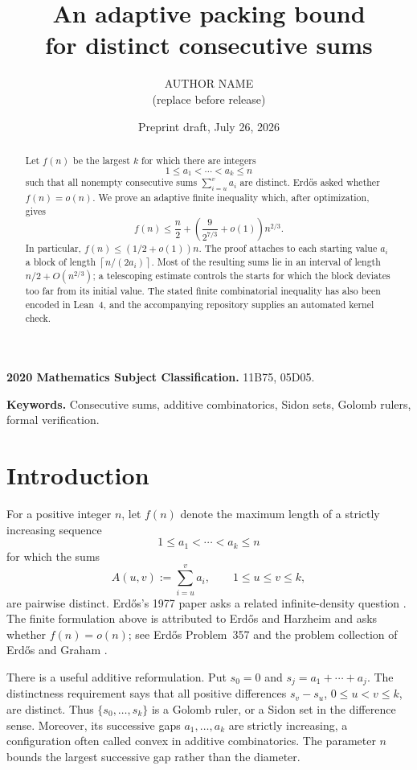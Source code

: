 \documentclass[11pt]{article}
\title{\bfseries An adaptive packing bound\\
for distinct consecutive sums}
\author{AUTHOR NAME\\\small (replace before release)}
\date{Preprint draft, July 26, 2026}
\numberwithin{equation}{section}
\theoremstyle{remark}
\newcommand{\ceil}[1]{\left\lceil #1\right\rceil}
\begin{document}
\maketitle

\begin{abstract}
Let \(f(n)\) be the largest \(k\) for which there are integers
\[
  1\leq a_1<\cdots<a_k\leq n
\]
such that all nonempty consecutive sums
\(\sum_{i=u}^{v}a_i\) are distinct.  Erd\H{o}s asked whether
\(f(n)=o(n)\).  We prove an adaptive finite inequality which, after
optimization, gives
\[
  f(n)\leq \frac n2+
  \left(\frac{9}{2^{7/3}}+o(1)\right)n^{2/3}.
\]
In particular, \(f(n)\leq (1/2+o(1))n\).  The proof attaches to each
starting value \(a_i\) a block of length
\(\ceil{n/(2a_i)}\).  Most of the resulting sums lie in an interval of
length \(n/2+O(n^{2/3})\); a telescoping estimate controls the starts
for which the block deviates too far from its initial value.  The
stated finite combinatorial inequality has also been encoded in
Lean~4, and the accompanying repository supplies an automated kernel
check.
\end{abstract}

\noindent\textbf{2020 Mathematics Subject Classification.}
11B75, 05D05.

\smallskip
\noindent\textbf{Keywords.}
Consecutive sums, additive combinatorics, Sidon sets, Golomb rulers,
formal verification.

\section{Introduction}

For a positive integer \(n\), let \(f(n)\) denote the maximum length of
a strictly increasing sequence
\[
  1\leq a_1<\cdots<a_k\leq n
\]
for which the sums
\begin{equation}
  A(u,v):=\sum_{i=u}^{v}a_i,
  \qquad 1\leq u\leq v\leq k,
  \label{eq:block-sums}
\end{equation}
are pairwise distinct.  Erd\H{o}s's 1977 paper asks a related
infinite-density question \cite{Erdos1977}.  The finite formulation
above is attributed to Erd\H{o}s and Harzheim and asks whether
\(f(n)=o(n)\); see Erd\H{o}s Problem~357
\cite{ErdosProblems357} and the problem collection of Erd\H{o}s and
Graham \cite{ErdosGraham1980}.

There is a useful additive reformulation.  Put \(s_0=0\) and
\(s_j=a_1+\cdots+a_j\).  The distinctness requirement says that all
positive differences \(s_v-s_u\), \(0\leq u<v\leq k\), are distinct.
Thus \(\{s_0,\ldots,s_k\}\) is a Golomb ruler, or a Sidon set in the
difference sense.  Moreover, its successive gaps \(a_1,\ldots,a_k\)
are strictly increasing, a configuration often called convex in
additive combinatorics.  The parameter \(n\) bounds the largest
successive gap rather than the diameter.
\end{document}
